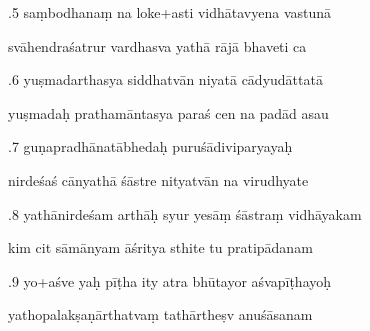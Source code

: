 \documentclass[article,12pt,a4paper]{memoir}%
\newcounter{parCount}
\begin{document}
	  
	  \pstart {}.5 saṃbodhanaṃ na loke+asti vidhātavyena vastunā 
	{}
	\pend%
      

	  
	  \pstart \leavevmode%
	svāhendraśatrur vardhasva yathā rājā bhaveti ca 
	{}
	\pend%
      

	  
	  \pstart {}.6 yuṣmadarthasya siddhatvān niyatā cādyudāttatā 
	{}
	\pend%
      

	  
	  \pstart \leavevmode%
	yuṣmadaḥ prathamāntasya paraś cen na padād asau 
	{}
	\pend%
      

	  
	  \pstart {}.7 guṇapradhānatābhedaḥ puruśādiviparyayaḥ 
	{}
	\pend%
      

	  
	  \pstart \leavevmode%
	nirdeśaś cānyathā śāstre nityatvān na virudhyate 
	{}
	\pend%
      

	  
	  \pstart {}.8 yathānirdeśam arthāḥ syur yesāṃ śāstraṃ vidhāyakam 
	{}
	\pend%
      

	  
	  \pstart \leavevmode%
	kim cit sāmānyam āśritya sthite tu pratipādanam 
	{}
	\pend%
      

	  
	  \pstart {}.9 yo+aśve yaḥ pīṭha ity atra bhūtayor aśvapīṭhayoḥ 
	{}
	\pend%
      

	  
	  \pstart \leavevmode%
	yathopalakṣaṇārthatvaṃ tathārtheṣv anuśāsanam 
	{}
	\pend%
      
\end{document}
